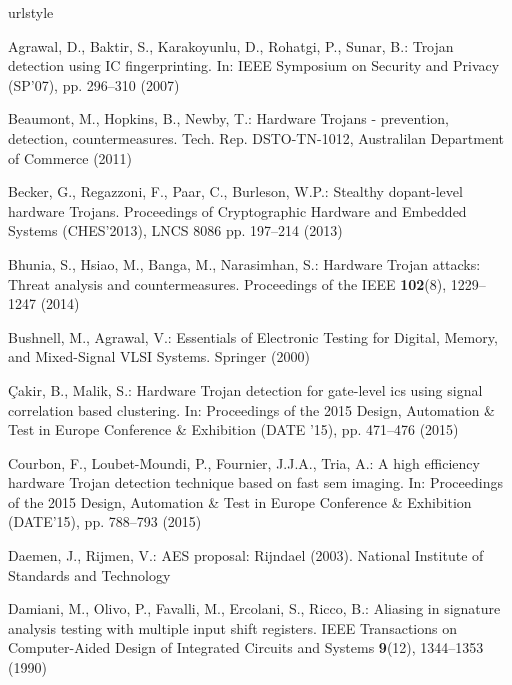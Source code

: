 \documentclass[a4paper]{llncs}
\begin{document}
\begin{thebibliography}{10}
\providecommand{\url}[1]{{#1}}
\providecommand{\urlprefix}{URL }
\expandafter\ifx\csname urlstyle\endcsname\relax
  \providecommand{\doi}[1]{DOI~\discretionary{}{}{}#1}\else
  \providecommand{\doi}{DOI~\discretionary{}{}{}\begingroup
  \urlstyle{rm}\Url}\fi

Agrawal, D., Baktir, S., Karakoyunlu, D., Rohatgi, P., Sunar, B.: Trojan
  detection using {IC} fingerprinting.
\newblock In: IEEE Symposium on Security and Privacy (SP'07), pp. 296--310
  (2007)

Beaumont, M., Hopkins, B., Newby, T.: Hardware {T}rojans - prevention,
  detection, countermeasures.
\newblock Tech. Rep. DSTO-TN-1012, Australilan Department of Commerce (2011)

Becker, G., Regazzoni, F., Paar, C., Burleson, W.P.: Stealthy dopant-level
  hardware {T}rojans.
\newblock Proceedings of Cryptographic Hardware and Embedded Systems
  (CHES'2013), LNCS 8086 pp. 197--214 (2013)

Bhunia, S., Hsiao, M., Banga, M., Narasimhan, S.: Hardware {T}rojan attacks:
  Threat analysis and countermeasures.
\newblock Proceedings of the IEEE \textbf{102}(8), 1229--1247 (2014)

Bushnell, M., Agrawal, V.: Essentials of Electronic Testing for Digital,
  Memory, and Mixed-Signal {VLSI} Systems.
\newblock Springer (2000)

\c{C}akir, B., Malik, S.: Hardware {T}rojan detection for gate-level ics using
  signal correlation based clustering.
\newblock In: Proceedings of the 2015 Design, Automation \& Test in Europe
  Conference \& Exhibition (DATE '15), pp. 471--476 (2015)

Courbon, F., Loubet-Moundi, P., Fournier, J.J.A., Tria, A.: A high efficiency
  hardware {T}rojan detection technique based on fast sem imaging.
\newblock In: Proceedings of the 2015 Design, Automation \& Test in Europe
  Conference \& Exhibition (DATE'15), pp. 788--793 (2015)

Daemen, J., Rijmen, V.: {AES} proposal: Rijndael (2003).
\newblock National Institute of Standards and Technology

Damiani, M., Olivo, P., Favalli, M., Ercolani, S., Ricco, B.: Aliasing in
  signature analysis testing with multiple input shift registers.
\newblock IEEE Transactions on Computer-Aided Design of Integrated Circuits and
  Systems \textbf{9}(12), 1344--1353 (1990)


\end{thebibliography}
\end{document}

